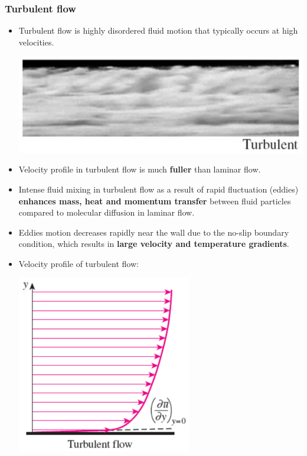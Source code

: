 \documentclass[11pt]{article}
\begin{document}
\subsubsection{Turbulent flow}
\label{sec:org5cd05b1}
\begin{itemize}
\item Turbulent flow is highly disordered fluid motion that typically occurs at high velocities.
\begin{center}
\includegraphics[width=.9\linewidth]{./images/turbulent-flow-photo.png}
\end{center}
\item Velocity profile in turbulent flow is much \textbf{fuller} than laminar flow.
\item Intense fluid mixing in turbulent flow as a result of rapid fluctuation (eddies) \textbf{enhances mass, heat and momentum transfer} between fluid particles compared to molecular diffusion in laminar flow.
\item Eddies motion decreases rapidly near the wall due to the no-slip boundary condition, which results in \textbf{large velocity and temperature gradients}.
\item Velocity profile of turbulent flow:
\begin{center}
\includegraphics[height=21em]{./images/turbulent-flow-graph.png}
\end{center}
\end{itemize}
\end{document}
